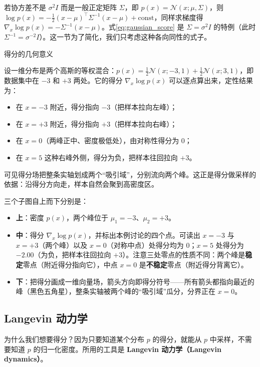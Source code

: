 \begin{framed}{}
若协方差不是 $\sigma^2 I$ 而是一般正定矩阵 $\Sigma$，即 $p(x)=\mathcal N(x;\mu,\Sigma)$，则 $\log p(x)=-\tfrac12(x-\mu)^\top\Sigma^{-1}(x-\mu)+\text{const}$，同样求梯度得 $\nabla_x\log p(x)=-\Sigma^{-1}(x-\mu)$。式\eqref{eq:gaussian_score} 是 $\Sigma=\sigma^2 I$ 的特例（此时 $\Sigma^{-1}=\sigma^{-2}I$）。这一节为了简化，我们只考虑这种各向同性的式子。
\end{framed}

\begin{example}{得分的几何意义}{}

设一维分布是两个高斯的等权混合：$p(x)=\tfrac12\mathcal N(x;-3,1)+\tfrac12\mathcal N(x;3,1)$，即数据集中在 $-3$ 和 $+3$ 两处。它的得分 $\nabla_x\log p(x)$ 可以逐点算出来，定性结果为：
\begin{itemize}
\item 在 $x=-3$ 附近，得分指向 $-3$（把样本拉向左峰）；
\item 在 $x=+3$ 附近，得分指向 $+3$（把样本拉向右峰）；
\item 在 $x=0$（两峰正中、密度极低处），由对称性得分为 $0$；
\item 在 $x=5$ 这种右峰外侧，得分为负，把样本往回拉向 $+3$。
\end{itemize}
可见得分场把整条实轴划成两个“吸引域”，分别流向两个峰。这正是得分做采样的依据：沿得分方向走，样本自然会聚到高密度区。

三个子图自上而下分别是：
\begin{itemize}
\item \textbf{上}：密度 $p(x)$，两个峰位于 $\mu_1=-3$、$\mu_2=+3$。
\item \textbf{中}：得分 $\nabla_x\log p(x)$，并标出本例讨论的四个点。可读出 $x=-3$ 与 $x=+3$（两个峰）以及 $x=0$（对称中点）处得分均为 $0$；$x=5$ 处得分为 $-2.00$（为负，把样本往回拉向 $+3$）。注意三处零点的性质不同：两个峰是\textbf{稳定}零点（附近得分指向它），中点 $x=0$ 是\textbf{不稳定}零点（附近得分背离它）。
\item \textbf{下}：把得分画成一维向量场，箭头方向即得分符号——所有箭头都指向最近的峰（黑色五角星），整条实轴被两个峰的“吸引域”瓜分，分界正在 $x=0$。
\end{itemize}
\end{example}

\subsection{Langevin 动力学}

为什么我们想要得分？因为只要知道某个分布 $p$ 的得分，就能从 $p$ 中采样，不需要知道 $p$ 的归一化密度。所用的工具是 \textbf{Langevin 动力学（Langevin dynamics）}。


